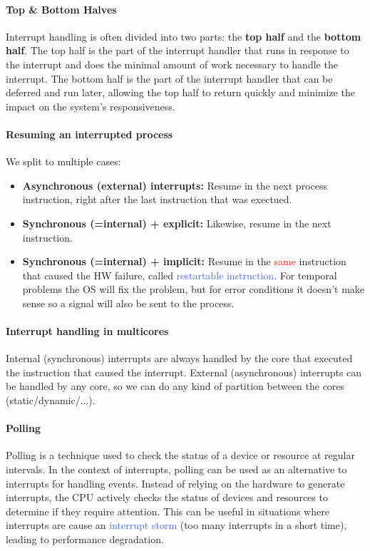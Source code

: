 \documentclass[openany,12pt]{book}
\newcommand{\red}[1]{\textcolor{Red}{#1}}
\newcommand{\blue}[1]{\textcolor{RoyalBlue}{#1}}
\begin{document}
\paragraph{Top \& Bottom Halves} Interrupt handling is often divided into two parts: the \textbf{top half} and the \textbf{bottom half}. The top half is the part of the interrupt handler that runs in response to the interrupt and does the minimal amount of work necessary to handle the interrupt. The bottom half is the part of the interrupt handler that can be deferred and run later, allowing the top half to return quickly and minimize the impact on the system's responsiveness.


\paragraph{Resuming an interrupted process} We split to multiple cases:
\begin{itemize}
  \item \textbf{Asynchronous (external) interrupts:} Resume in the next process instruction, right after the last instruction that was exectued.

  \item \textbf{Synchronous (=internal) + explicit:} Likewise, resume in the next instruction.

  \item \textbf{Synchronous (=internal) + implicit:} Resume in the \red{same} instruction that caused the HW failure, called \blue{restartable instruction}. For temporal problems the OS will fix the problem, but for error conditions it doesn't make sense so a signal will also be sent to the process.
\end{itemize}


\paragraph{Interrupt handling in multicores} Internal (synchronous) interrupts are always handled by the core that executed the instruction that caused the interrupt. External (asynchronous) interrupts can be handled by any core, so we can do any kind of partition between the cores (static/dynamic/...).


\paragraph{Polling} Polling is a technique used to check the status of a device or resource at regular intervals. In the context of interrupts, polling can be used as an alternative to interrupts for handling events. Instead of relying on the hardware to generate interrupts, the CPU actively checks the status of devices and resources to determine if they require attention. This can be useful in situations where interrupts are cause an \blue{interrupt storm} (too many interrupts in a short time), leading to performance degradation. 
\end{document}
